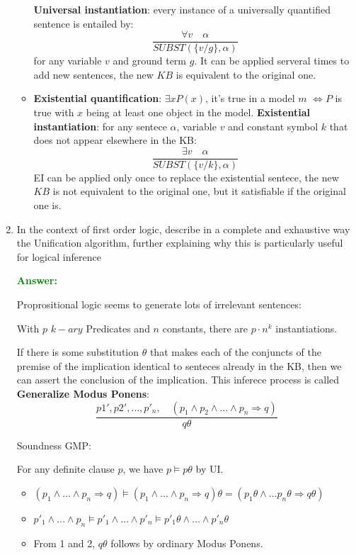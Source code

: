 \documentclass[12pt]{article}
\begin{document}
\begin{enumerate}[label=\textbf{FOL.\arabic*}]
\begin{itemize}
        \textbf{Universal instantiation}: every instance of a universally quantified sentence is entailed by: 
        \begin{equation}
            \frac{\forall v \quad \alpha}{SUBST(\{v/g\},\alpha)}
        \end{equation}
        for any variable $v$ and ground term $g$. It can be applied serveral times to add new sentences, the new $KB$ is equivalent to the original one.
        \item\textbf{Existential quantification}: $\exists x P(x)$, it's true in a model $m$ $\iff P$ is true with $x$ being 
        at least one object in the model.
        \textbf{Existential instantiation}: for any sentece $\alpha$, variable $v$ and constant symbol $k$ that does not appear elsewhere in the KB:
        \begin{equation}
            \frac{\exists v \quad \alpha}{SUBST(\{v/k\},\alpha)}
        \end{equation}
        EI can be applied only once to replace the existential sentece, the new $KB$ is not equivalent to the original one, but it satisfiable
        if the original one is.
    \end{itemize}

    \item In the context of first order logic, describe in a complete and exhaustive way the Unification algorithm, further explaining why this is particularly useful for logical inference
    
    \textcolor{green}{\textbf{Answer:}}

    Proprositional logic seems to generate lots of irrelevant sentences:
    \begin{center}
        With $p$ $k-ary$ Predicates and $n$ constants, there are $p\cdot n^k$ instantiations.
    \end{center}

    If there is some substitution $\theta$ that makes each of the conjuncts of the premise of the implication identical 
    to senteces already in the KB, then we can assert the conclusion of the implication.
    This inferece process is called \textbf{Generalize Modus Ponens}:
    \begin{equation}
        \frac{p1',p2',\ldots,p'_n,\quad (p_1\land p_2\land\ldots\land p_n \Rightarrow q)}
        {q\theta}
    \end{equation}

    Soundness GMP:

    For any definite clause $p$, we have $p\vDash p\theta$ by UI.
    \begin{itemize}
        \item $(p_1\land\ldots\land p_n \Rightarrow q)\vDash(p_1\land\ldots\land p_n \Rightarrow q)\theta=(p_1\theta\land\ldots p_n\theta\Rightarrow q\theta)$
        \item $p'_1\land\ldots\land p_n \vDash p'_1\land\ldots\land p'_n\vDash p'_1\theta\land\ldots\land p'_n\theta$
        \item From 1 and 2, $q\theta$ follows by ordinary Modus Ponens.
    \end{itemize}


\end{enumerate}
\end{document}
